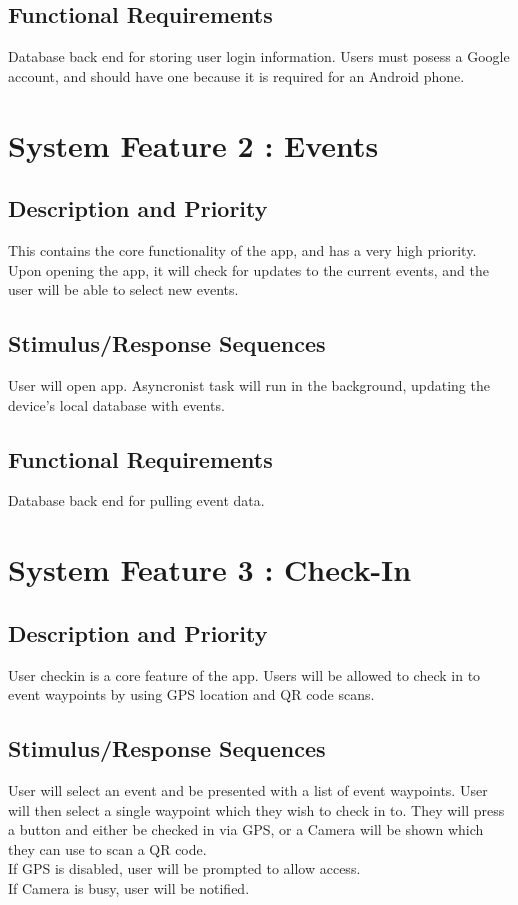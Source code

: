\documentclass{scrreprt}
\begin{document}
\subsection{Functional Requirements}
Database back end for storing user login information. Users must posess a Google 
account, and should have one because it is required for an Android phone.

\section{System Feature 2 : Events}

\subsection{Description and Priority}
This contains the core functionality of the app, and has a very high priority. Upon opening 
the app, it will check for updates to the current events, and the user will be able to 
select new events.

\subsection{Stimulus/Response Sequences}
User will open app. Asyncronist task will run in the background, updating the device's
local database with events.

\subsection{Functional Requirements}
Database back end for pulling event data.

\section{System Feature 3 : Check-In}

\subsection{Description and Priority}
User checkin is a core feature of the app. Users will be allowed to check in to event waypoints
by using GPS location and QR code scans.

\subsection{Stimulus/Response Sequences}
User will select an event and be presented with a list of event waypoints. User will then
select a single waypoint which they wish to check in to. They will press a button and either
be checked in via GPS, or a Camera will be shown which they can use to scan a QR code. \\
If GPS is disabled, user will be prompted to allow access. \\
If Camera is busy, user will be notified.
\end{document}

